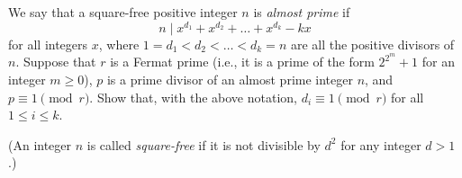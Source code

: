 We say that a square-free positive integer \(n\) is \emph{almost prime} if
\[
n \mid x^{d_1} + x^{d_2} + \ldots + x^{d_k} - kx
\]
for all integers \(x\), where \(1 = d_1 < d_2 < \ldots < d_k = n\) are all the positive divisors of \(n\). Suppose that \(r\) is a Fermat prime (i.e., it is a prime of the form \(2^{2^m} + 1\) for an integer \(m \ge 0\)), \(p\) is a prime divisor of an almost prime integer \(n\), and \(p \equiv 1 \pmod{r}\). Show that, with the above notation, \(d_i \equiv 1 \pmod{r}\) for all \(1 \le i \le k\).

(An integer \(n\) is called \emph{square-free} if it is not divisible by \(d^2\) for any integer \(d > 1\).)
